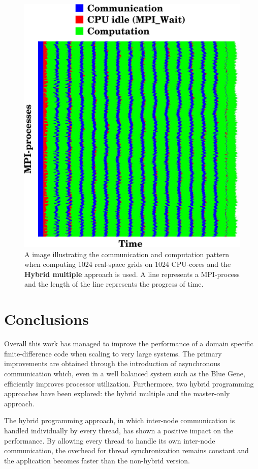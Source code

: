 \documentclass[preprint,3p,times,twocolumn]{elsarticle}
\begin{document}
\begin{figure}
 \centering
 \includegraphics[width=\linewidth]{gfx/prof}
 \caption{A image illustrating the communication and computation pattern when computing 1024 real-space grids on 1024 CPU-cores and the \textbf{Hybrid multiple} approach is used. A line represents a MPI-process and the length of the line represents the progress of time.}
 \label{fig:prof}
\end{figure}

\section{Conclusions}
Overall this work has managed to improve the performance of a domain specific finite-difference code when scaling to very large systems. The primary improvements are obtained through the introduction of asynchronous communication which, even in a well balanced system such as the Blue Gene, efficiently improves processor utilization. Furthermore, two hybrid programming approaches have been explored: the hybrid multiple and the master-only approach. 

The hybrid programming approach, in which inter-node communication is handled individually by every thread, has shown a positive impact on the performance. By allowing every thread to handle its own inter-node communication, the overhead for thread synchronization remains constant and the application becomes faster than the non-hybrid version.
\end{document}
